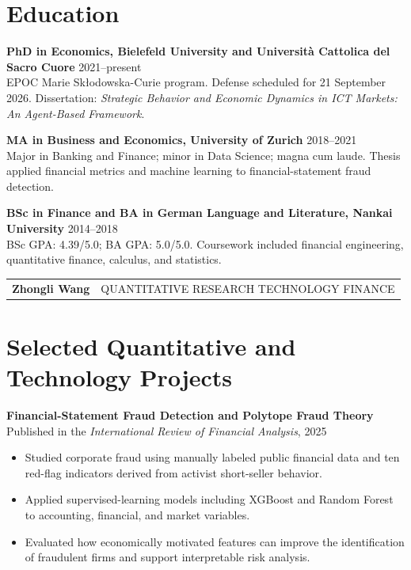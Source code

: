 \documentclass[a4paper,11pt]{article}
\newcommand{\project}[2]{%
  \textbf{#1}\\[-1pt]
  \textcolor{muted}{\small #2}\par
}
\begin{document}
\section{Education}
\textbf{PhD in Economics, Bielefeld University and Universit\`a Cattolica del Sacro Cuore} \hfill 2021--present\\
EPOC Marie Sk\l odowska-Curie program. Defense scheduled for 21 September 2026. Dissertation: \textit{Strategic Behavior and Economic Dynamics in ICT Markets: An Agent-Based Framework}.

\textbf{MA in Business and Economics, University of Zurich} \hfill 2018--2021\\
Major in Banking and Finance; minor in Data Science; magna cum laude. Thesis applied financial metrics and machine learning to financial-statement fraud detection.

\textbf{BSc in Finance and BA in German Language and Literature, Nankai University} \hfill 2014--2018\\
BSc GPA: 4.39/5.0; BA GPA: 5.0/5.0. Coursework included financial engineering, quantitative finance, calculus, and statistics.

\begin{tabularx}{\linewidth}{@{}Xr@{}}
  {\large\textbf{\textcolor{accent}{Zhongli Wang}}} &
  {\small\textcolor{muted}{QUANTITATIVE RESEARCH \textbar{} TECHNOLOGY \textbar{} FINANCE}}\\
\end{tabularx}

\section{Selected Quantitative and Technology Projects}
\project{Financial-Statement Fraud Detection and Polytope Fraud Theory}{Published in the \textit{International Review of Financial Analysis}, 2025}
\begin{itemize}
  \item Studied corporate fraud using manually labeled public financial data and ten red-flag indicators derived from activist short-seller behavior.
  \item Applied supervised-learning models including XGBoost and Random Forest to accounting, financial, and market variables.
  \item Evaluated how economically motivated features can improve the identification of fraudulent firms and support interpretable risk analysis.
\end{itemize}
\end{document}
